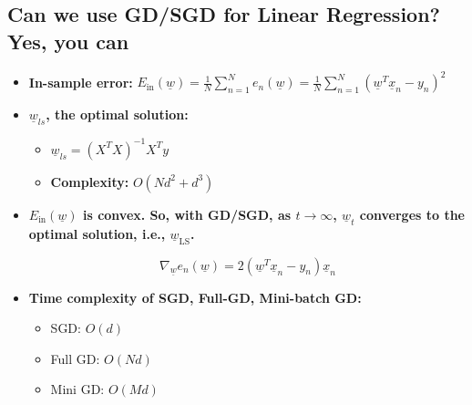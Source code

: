 \subsection{Can we use GD/SGD for Linear Regression? Yes, you can}
\begin{definition}
    \begin{itemize}
        \item \textbf{In-sample error:} $E_{\text{in}}(\underline{w}) = \frac{1}{N} \sum_{n=1}^{N} e_n(\underline{w}) = \frac{1}{N} \sum_{n=1}^{N} (\underline{w}^T \underline{x}_n - y_n)^2$
    
        \item \textbf{\( \underline{w}_{ls} \), the optimal solution:}
        \begin{itemize}
            \item $ \underline{w}_{ls} = (X^T X)^{-1} X^T y $
            \item \textbf{Complexity:} \( O(Nd^2 + d^3) \)
        \end{itemize}
    
        \item \textbf{\( E_{\text{in}}(\underline{w}) \) is convex. So, with GD/SGD, as \( t \to \infty \), \( \underline{w}_t \) converges to the optimal solution, i.e., \( \underline{w}_{\text{LS}} \).}
    
        \[
        \nabla_{\underline{w}} e_n(\underline{w}) = 2 (\underline{w}^T \underline{x}_n - y_n) \underline{x}_n
        \]
    
        \item \textbf{Time complexity of SGD, Full-GD, Mini-batch GD:}
        \begin{itemize}
            \item SGD: \( O(d) \)
            \item Full GD: \( O(Nd) \)
            \item Mini GD: \( O(Md) \)
        \end{itemize}
    \end{itemize}
\end{definition}

